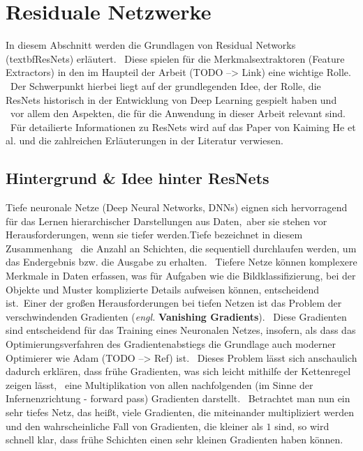 \section{Residuale Netzwerke}\label{sec:ResidualNetworks}
In diesem Abschnitt werden die Grundlagen von Residual Networks (textbf{\glqq ResNets\grqq{}}) erläutert. \
Diese spielen für die Merkmalsextraktoren (\glqq Feature Extractors\grqq{}) in den im Haupteil der Arbeit (TODO --> Link) eine wichtige Rolle. \
Der Schwerpunkt hierbei liegt auf der grundlegenden Idee, der Rolle, die ResNets historisch in der Entwicklung von Deep Learning gespielt haben und \
vor allem den Aspekten, die für die Anwendung in dieser Arbeit relevant sind. \ 
Für detailierte Informationen zu ResNets wird auf das Paper von Kaiming He et al. \cite{resnet} und die zahlreichen Erläuterungen in der Literatur verwiesen. \
\subsection{Hintergrund \& Idee hinter \glqq ResNets\grqq{}}\label{subsec:ResNetsBackgroundAndIdea}
Tiefe neuronale Netze (Deep Neural Networks, DNNs) eignen sich hervorragend für das Lernen hierarchischer Darstellungen aus Daten,\
aber sie stehen vor Herausforderungen, wenn sie \glqq tiefer\grqq{} werden.\glqq Tiefe\grqq{} bezeichnet in diesem Zusammenhang \ 
die Anzahl an Schichten, die sequentiell durchlaufen werden, um das Endergebnis bzw. die Ausgabe zu erhalten. \
Tiefere Netze können komplexere Merkmale in Daten erfassen, was für Aufgaben wie die Bildklassifizierung, bei der Objekte und Muster komplizierte Details aufweisen können, entscheidend ist.\
Einer der großen Herausforderungen bei tiefen Netzen ist das Problem der \glqq verschwindenden Gradienten\grqq{} (\textit{engl.} \textbf{Vanishing Gradients}). \
Diese Gradienten sind entscheidend für das Training eines Neuronalen Netzes, insofern, als dass das Optimierungsverfahren des Gradientenabstiegs die Grundlage auch moderner Optimierer wie \glqq Adam\grqq{} (TODO --> Ref) ist. \ 
Dieses Problem lässt sich anschaulich dadurch erklären, dass frühe Gradienten, was sich leicht mithilfe der Kettenregel zeigen lässt, \ 
eine Multiplikation von allen nachfolgenden (im Sinne der Infernenzrichtung - \glqq forward pass\grqq{}) Gradienten darstellt. \
Betrachtet man nun ein sehr tiefes Netz, das heißt, viele Gradienten, die miteinander multipliziert werden und den wahrscheinliche Fall von Gradienten, die kleiner als $1$ sind, so wird schnell klar, dass frühe Schichten einen sehr kleinen Gradienten haben können. \
